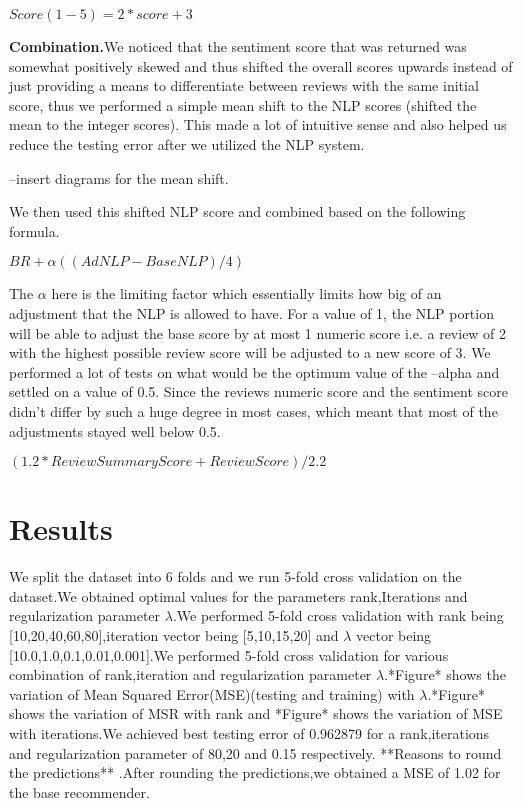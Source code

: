 \documentclass{article} %
\begin{document}
$Score (1-5 ) = 2*score + 3$


\textbf{Combination.}We noticed that the sentiment score that was returned was somewhat positively skewed and thus shifted the overall scores upwards instead of just providing a means to differentiate between reviews with the same initial score, thus we performed a simple mean shift to the NLP scores (shifted the mean to the integer scores). This made a lot of intuitive sense and also helped us reduce the testing error after we utilized the NLP system. 

--insert diagrams for the mean shift. 

We then used this shifted NLP score and combined based on the following formula. 

$BR + \alpha((AdNLP - BaseNLP)/4) $

The $\alpha$ here is the limiting factor which essentially limits how big of an adjustment that the NLP is allowed to have. For a value of 1, the NLP portion will be able to adjust the base score by at most 1 numeric score i.e. a review of 2 with the highest possible review score will be adjusted to a new score of 3. We performed a lot of tests on what would be the optimum value of the --alpha and settled on a value of 0.5. Since the reviews numeric score and the sentiment score didn't differ by such a huge degree in most cases, which meant that most of the adjustments stayed well below 0.5.  

$(1.2 * Review Summary Score  + Review Score ) /2.2 $

\section{Results}
We split the dataset into 6 folds and we run 5-fold cross validation on the dataset.We obtained optimal values for the parameters rank,Iterations and regularization parameter $\lambda$.We performed 5-fold cross validation with rank being [10,20,40,60,80],iteration vector being [5,10,15,20] and $\lambda$ vector being [10.0,1.0,0.1,0.01,0.001].We performed 5-fold cross validation for various combination of rank,iteration and regularization parameter  $\lambda$.*Figure*  shows the variation of Mean Squared Error(MSE)(testing and training) with $\lambda$.*Figure* shows the variation of MSR with rank and *Figure* shows the variation of MSE with iterations.We achieved best testing error of 0.962879 for a rank,iterations and regularization parameter of  80,20 and 0.15 respectively.
**Reasons to round the predictions** .After rounding the predictions,we obtained a MSE of 1.02 for the base recommender.
\end{document}
